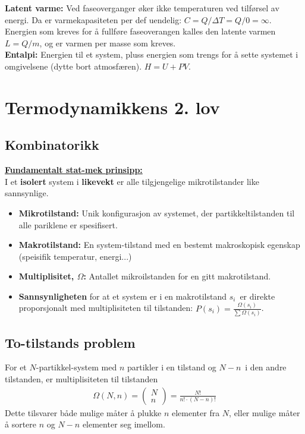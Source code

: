 \documentclass[10pt,a4paper]{article}
\renewcommand{\b}{\textbf}
\renewcommand{\u}{\underline}
\begin{document}
\begin{multicols}{2}
\begin{oframed}
\b{Latent varme:} Ved faseoverganger øker ikke temperaturen ved tilførsel av energi. Da er varmekapasiteten per def uendelig: $C = Q/\Delta T = Q/0 = \infty$. Energien som kreves for å fullføre faseoverangen kalles den latente varmen $L = Q/m$, og er varmen per masse som kreves.
\\

\b{Entalpi:} Energien til et system, pluss energien som trengs for å sette systemet i omgivelsene (dytte bort atmosfæren). $H = U + PV$.
\end{oframed}



\section{Termodynamikkens 2. lov}

\subsection*{Kombinatorikk}
\begin{framed}
\u{\b{Fundamentalt stat-mek prinsipp:}}\\
I et \b{isolert} system i \b{likevekt} er alle tilgjengelige mikrotilstander like sannsynlige.

\begin{itemize}
\item \b{Mikrotilstand:} Unik konfigurasjon av systemet, der partikkeltilstanden til alle pariklene er spesifisert.
\item \b{Makrotilstand:} En system-tilstand med en bestemt makroskopisk egenskap (speisifik temperatur, energi...)
\item \b{Multiplisitet, $\Omega$:} Antallet mikroilstanden for en gitt makrotilstand.
\item \b{Sannsynligheten} for at et system er i en makrotilstand $s_i$ er direkte proporsjonalt med multiplisiteten til tilstanden: $P(s_i) = \frac{\Omega(s_i)}{\sum\Omega(s_i)}$.
\end{itemize}
\end{framed}


\subsection*{To-tilstands problem}
\begin{framed}
For et $N$-partikkel-system med $n$ partikler i en tilstand og $N-n$ i den andre tilstanden, er multiplisiteten til tilstanden
\begin{align*}
	\Omega(N,n) = \begin{pmatrix} N\\ n \end{pmatrix}
	= \frac{N!}{n!\cdot (N-n)!}
\end{align*}
Dette tilsvarer både mulige måter å plukke $n$ elementer fra $N$, eller mulige måter å sortere $n$ og $N-n$ elementer seg imellom.
\end{framed}



\end{multicols}
\end{document}
